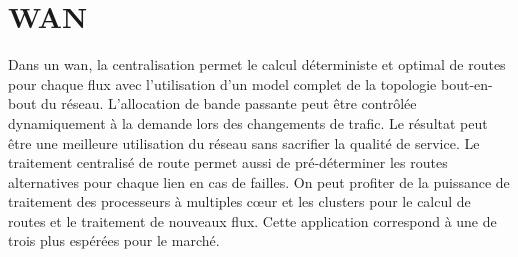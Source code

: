 

\section{WAN}
Dans un \gls{wan}, la centralisation permet le calcul déterministe et optimal de routes pour chaque flux avec l'utilisation d'un model complet de la topologie bout-en-bout du réseau. L'allocation de bande passante peut être contrôlée dynamiquement à la demande lors des changements de trafic. Le résultat peut être une meilleure utilisation du réseau sans sacrifier la qualité de service. Le traitement centralisé de route permet aussi de pré-déterminer les routes alternatives pour chaque lien en cas de failles. On peut profiter de la puissance de traitement des processeurs à multiples cœur et les \glspl{cluster} pour le calcul de routes et le traitement de nouveaux flux. Cette application correspond à une de trois plus espérées pour le marché. \cite{2013GuideSDNNVUseCases}





